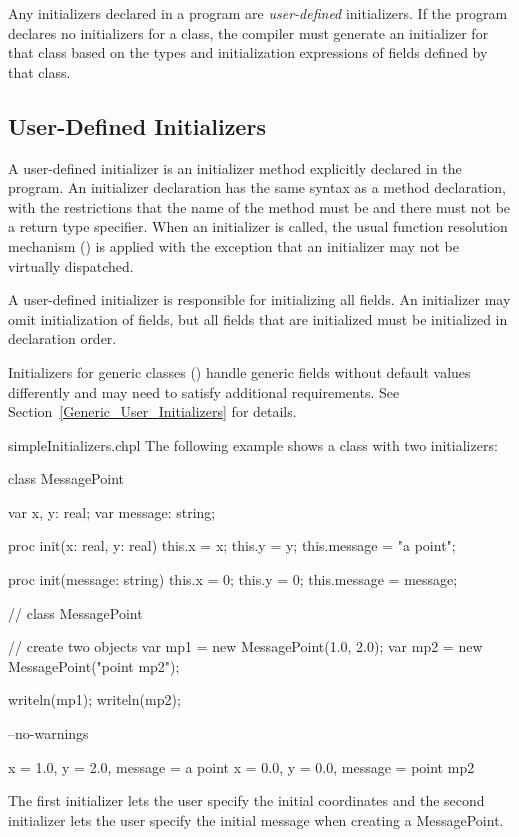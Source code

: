 Any initializers declared in a program are \emph{user-defined} initializers. If
the program declares no initializers for a class, the compiler must generate an
initializer for that class based on the types and initialization expressions of
fields defined by that class.

\subsection{User-Defined Initializers}
\label{User_Defined_Initializers}

A user-defined initializer is an initializer method explicitly declared in the
program.  An initializer declaration has the same syntax as a method
declaration, with the restrictions that the name of the method must be
 and there must not be a return type specifier. When an initializer
is called, the usual function resolution mechanism ()
is applied with the exception that an initializer may not be virtually
dispatched.

A user-defined initializer is responsible for initializing all fields. An
initializer may omit initialization of fields, but all fields that are
initialized must be initialized in declaration order.

Initializers for generic classes () handle generic fields
without default values differently and may need to satisfy additional
requirements.  See Section~\ref{Generic_User_Initializers} for details.

\begin{chapelexample}{simpleInitializers.chpl}
The following example shows a class with two initializers:
\begin{chapel}
class MessagePoint {
  var x, y: real;
  var message: string;

  proc init(x: real, y: real) {
    this.x = x;
    this.y = y;
    this.message = "a point";
  }

  proc init(message: string) {
    this.x = 0;
    this.y = 0;
    this.message = message;
  }
}  // class MessagePoint

// create two objects
var mp1 = new MessagePoint(1.0, 2.0);
var mp2 = new MessagePoint("point mp2");
\end{chapel}
\begin{chapelpost}
writeln(mp1);
writeln(mp2);
\end{chapelpost}
\begin{chapelcompopts}
--no-warnings
\end{chapelcompopts}
\begin{chapeloutput}
{x = 1.0, y = 2.0, message = a point}
{x = 0.0, y = 0.0, message = point mp2}
\end{chapeloutput}
The first initializer lets the user specify the initial coordinates
and the second initializer lets the user specify the initial message
when creating a MessagePoint.
\end{chapelexample}

